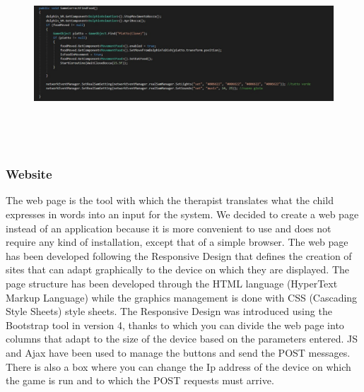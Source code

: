 \documentclass [12pt]{article}
\begin{document}
\begin{itemize}[•]
\begin{figure}[ht!]
\centering
\includegraphics[height=7cm,width=17cm]{FeedbackManager.jpg}
\end{figure}

\end{itemize}
\clearpage

\subsubsection{Website}
The web page is the tool with which the therapist translates what the child expresses in words into an input for the system.
We decided to create a web page instead of an application because it is more convenient to use and does not require any kind of installation, except that of a simple browser. The web page has been developed following the Responsive Design that defines the creation of sites that can adapt graphically to the device on which they are displayed.
The page structure has been developed through the HTML language (HyperText Markup Language) while the graphics management is done with CSS (Cascading Style Sheets) style sheets. The Responsive Design was introduced using the Bootstrap tool in version 4, thanks to which you can divide the web page into columns that adapt to the size of the device based on the parameters entered.
JS and Ajax have been used to manage the buttons and send the POST messages.
There is also a box where you can change the Ip address of the device on which the game is run and to which the POST requests must arrive. \\
\end{document}
